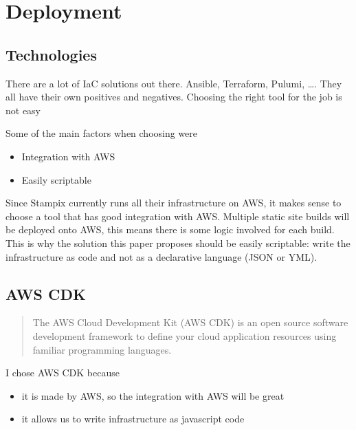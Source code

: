 
\chapter{Deployment} %

\label{Chapter5} 

\section{Technologies}

There are a lot of IaC solutions out there. Ansible, Terraform, Pulumi, \ldots. 
They all have their own positives and negatives. Choosing the right tool for the job is not easy

Some of the main factors when choosing were

\begin{itemize}
	\item Integration with AWS
	\item Easily scriptable
\end{itemize}

Since Stampix currently runs all their infrastructure on AWS, it makes sense to choose a tool that has good integration with AWS. 
Multiple static site builds will be deployed onto AWS, this means there is some logic involved for each build.
This is why the solution this paper proposes should be easily scriptable: write the infrastructure as code and not as a declarative language (JSON or YML).




\section{AWS CDK}

\begin{quote}
	The AWS Cloud Development Kit (AWS CDK) is an open source software development framework to define your cloud application resources using familiar programming languages.
	\hfill \cite{awscdk}
\end{quote}

I chose AWS CDK because 

\begin{itemize}
	\item it is made by AWS, so the integration with AWS will be great
	\item it allows us to write infrastructure as javascript code
\end{itemize}

